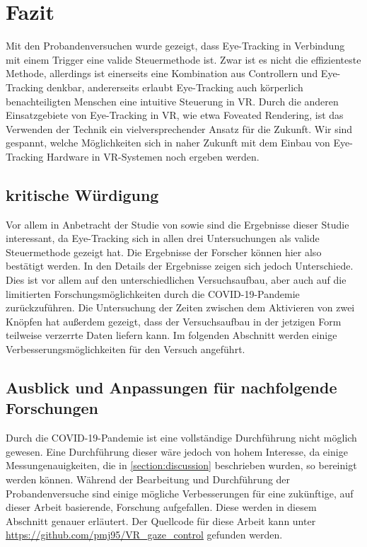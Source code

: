 
\chapter{Fazit}
Mit den Probandenversuchen wurde gezeigt, dass Eye-Tracking in Verbindung mit einem Trigger eine valide Steuermethode ist. Zwar ist es nicht die effizienteste Methode, allerdings ist einerseits eine Kombination aus Controllern und Eye-Tracking denkbar, andererseits erlaubt Eye-Tracking auch körperlich benachteiligten Menschen eine intuitive Steuerung in VR. Durch die anderen Einsatzgebiete von Eye-Tracking in VR, wie etwa Foveated Rendering, ist das Verwenden der Technik ein vielversprechender Ansatz für die Zukunft. Wir sind gespannt, welche Möglichkeiten sich in naher Zukunft mit dem Einbau von Eye-Tracking Hardware in VR-Systemen noch ergeben werden.

\section{kritische Würdigung}
Vor allem in Anbetracht der Studie von \citeauthor{Pai.2019} sowie \citeauthor{D.Kumar.2016} sind die Ergebnisse dieser Studie interessant, da Eye-Tracking sich in allen drei Untersuchungen als valide Steuermethode gezeigt hat. Die Ergebnisse der Forscher können hier also bestätigt werden. In den Details der Ergebnisse zeigen sich jedoch Unterschiede. Dies ist vor allem auf den unterschiedlichen Versuchsaufbau, aber auch auf die limitierten Forschungsmöglichkeiten durch die COVID-19-Pandemie zurückzuführen. Die Untersuchung der Zeiten zwischen dem Aktivieren von zwei Knöpfen hat außerdem gezeigt, dass der Versuchsaufbau in der jetzigen Form teilweise verzerrte Daten liefern kann. Im folgenden Abschnitt werden einige Verbesserungsmöglichkeiten für den Versuch angeführt. 

\section{Ausblick und Anpassungen für nachfolgende Forschungen}
Durch die COVID-19-Pandemie ist eine vollständige Durchführung nicht möglich gewesen. Eine Durchführung dieser wäre jedoch von hohem Interesse, da einige Messungenauigkeiten, die in \autoref{section:discussion} beschrieben wurden, so bereinigt werden können. Während der Bearbeitung und Durchführung der Probandenversuche sind einige mögliche Verbesserungen für eine zukünftige, auf dieser Arbeit basierende, Forschung aufgefallen. Diese werden in diesem Abschnitt genauer erläutert. Der Quellcode für diese Arbeit kann unter \url{https://github.com/pmj95/VR_gaze_control} gefunden werden.
